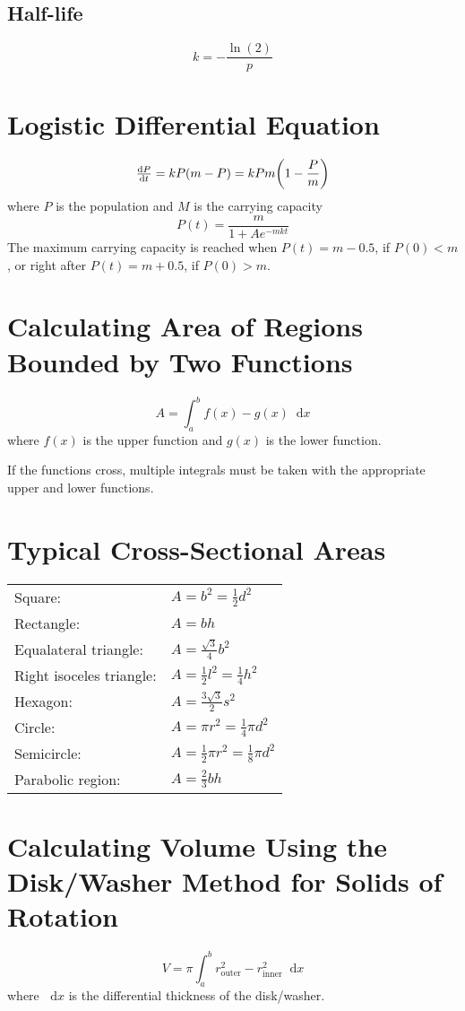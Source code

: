 \documentclass[12pt]{article}
\DeclarePairedDelimiter\paren{(}{)}
\newcommand*{\D}[1]{\mathop{}\!\mathrm{d}#1}
\newcommand*{\fixmath}{%
  \makebox{}\vspace{\glueexpr-\baselineskip-\abovedisplayskip}}
\newenvironment{fixaskip}{\setlength{\abovedisplayskip}{0pt}\fixmath%
  \ignorespaces}{\ignorespacesafterend}
\newenvironment{fixskip}{\setlength{\abovedisplayskip}{0pt}%
  \setlength{\belowdisplayskip}{0pt}\fixmath\ignorespaces}%
  {\ignorespacesafterend}
\begin{document}
\subsection*{Half-life}
\begin{fixskip}
  \[
    k = -\frac{\ln(2)}{p}
  \]
\end{fixskip}
\section*{Logistic Differential Equation}
\begin{fixaskip}
  \[
    \dd[P]{t} = kP(m - P) = kPm\paren*{1-\frac{P}{m}}
  \]
\end{fixaskip}
where \(P\) is the population and \(M\) is the carrying capacity
\[
  P(t) = \frac{m}{1 + Ae^{-mkt}}
\]
The maximum carrying capacity is reached when \(P(t) = m - 0.5\), if \(P(0) <
m\), or right after \(P(t) = m + 0.5\), if \(P(0) > m\).
\section*{Calculating Area of Regions Bounded by Two Functions}
\begin{fixaskip}
  \[
    A = \int_a^b f(x) - g(x) \D{x}
  \]
\end{fixaskip}
where \(f(x)\) is the upper function and \(g(x)\) is the lower function.

If the functions cross, multiple integrals must be taken with the appropriate
upper and lower functions.
\section*{Typical Cross-Sectional Areas}
{\renewcommand{\arraystretch}{1.5}\begin{tabular}{l@{ }l}
  Square: & \(A = b^2 = \frac{1}{2}d^2\)\\
  Rectangle: & \(A = bh\)\\
  Equalateral triangle: & \(A = \frac{\sqrt{3}}{4}b^2\)\\
  Right isoceles triangle: & \(A = \frac{1}{2}l^2 = \frac{1}{4}h^2\)\\
  Hexagon: & \(A = \frac{3\sqrt{3}}{2} s^2\)\\
  Circle: & \(A = \pi r^2 = \frac{1}{4}\pi d^2\)\\
  Semicircle: & \(A = \frac{1}{2}\pi r^2 = \frac{1}{8}\pi d^2\)\\
  Parabolic region: & \(A = \frac{2}{3}bh\)
\end{tabular}}
\section*{Calculating Volume Using the Disk\slash Washer Method for Solids of
Rotation}
\begin{fixaskip}
  \[
    V = \pi\int_a^b r_{\text{outer}}^2 - r_{\text{inner}}^2 \D{x}
  \]
\end{fixaskip}
where \(\D{x}\) is the differential thickness of the disk\slash washer.
\end{document}
